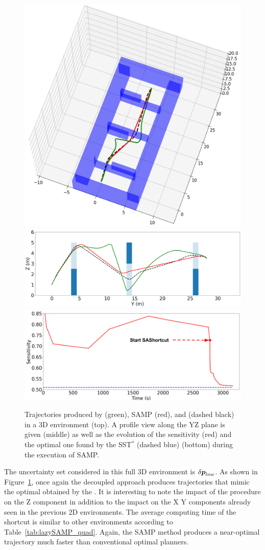 \begin{figure}[t]
\centering
    \includegraphics[width=0.7\linewidth]{figures/samp/3D_full_view.png}
    \includegraphics[width=0.7\linewidth]{figures/samp/3D_ZYprofile.png}
    \includegraphics[width=0.7\linewidth]{figures/samp/3D_sensi.png}
    \caption{Trajectories produced by  (green), SAMP (red), and  (dashed black) in a 3D environment (top). A profile view along the YZ plane is given (middle) as well as the evolution of the sensitivity (red) and the optimal one found by the SST$^*$ (dashed blue) (bottom) during the execution of SAMP.}
    \label{fig:3D}
\end{figure}

The uncertainty set considered in this full 3D environment is $\delta\boldsymbol{p}_{low}$.
As shown in Figure~\ref{fig:3D}, once again the decoupled approach produces trajectories that mimic the optimal obtained by the .
It is interesting to note the impact of the  procedure on the Z component in addition to the impact on the X Y components already seen in the previous 2D environments.
The average computing time of the shortcut is similar to other environments according to Table~\ref{tab:lazySAMP_quad}.
Again, the SAMP method produces a near-optimal trajectory much faster than conventional optimal planners.

